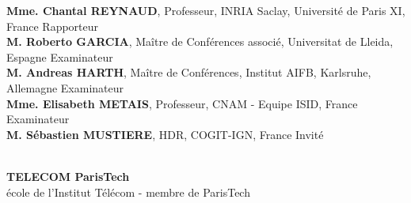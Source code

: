 \begin{titlepage}
\begin{minipage}{.9\textwidth}
{\bf Mme. Chantal REYNAUD}, {\small Professeur, INRIA Saclay, Universit\'{e} de Paris XI, France}
	\hfill Rapporteur\\
{\bf M. Roberto GARCIA}, {\small Ma\^{i}tre de Conférences associ\'{e}, Universitat de Lleida, Espagne }
	\hfill Examinateur\\
{\bf M. Andreas HARTH}, {\small Ma\^{i}tre de Conf\'{e}rences, Institut AIFB, Karlsruhe, Allemagne}
	\hfill Examinateur\\
{\bf Mme. Elisabeth METAIS}, {\small Professeur, CNAM - Equipe ISID, France}
	\hfill Examinateur\\
{\bf M. S\'{e}bastien MUSTIERE}, {\small HDR, COGIT-IGN, France}
	\hfill Invit\'{e}\\

\end{minipage}\\
%
%
%
%
%
%
\centering
{\bf TELECOM ParisTech}\\
{\small \'{e}cole de l'Institut T\'{e}l\'{e}com - membre de ParisTech}
%
%
%
\end{titlepage}
